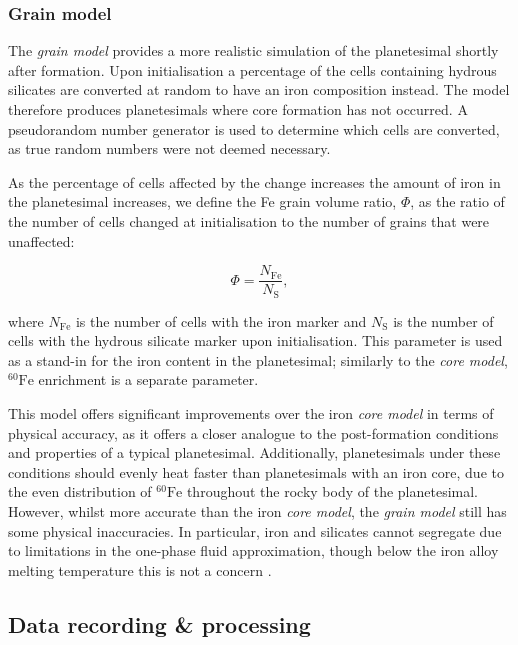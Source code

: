 \documentclass[fleqn,usenatbib]{mnras}
\newcommand{\rms}[1]{\ensuremath{_{\text{#1}}}}
\newcommand{\atom}[2]{$^{#2}\text{#1}$}
\newcommand{\fe}{\atom{Fe}{60}}
\begin{document}
\subsubsection{Grain model}

The \emph{grain model} provides a more realistic simulation of the planetesimal shortly after formation.
Upon initialisation a percentage of the cells containing hydrous silicates are converted at random to have an iron composition instead.
The model therefore produces planetesimals where core formation has not occurred.
A pseudorandom number generator is used to determine which cells are converted, as true random numbers were not deemed necessary.

As the percentage of cells affected by the change increases the amount of iron in the planetesimal increases, we define the Fe grain volume ratio, $\Phi$, as the ratio of the number of cells changed at initialisation to the number of grains that were unaffected:

\begin{equation}
  \label{eq:phi}
  \Phi = \frac{N\rms{Fe}}{N\rms{S}} , 
\end{equation}

\noindent
where $N\rms{Fe}$ is the number of cells with the iron marker and $N\rms{S}$ is the number of cells with the hydrous silicate marker upon initialisation.
This parameter is used as a stand-in for the iron content in the planetesimal; similarly to the \emph{core model}, \fe{} enrichment is a separate parameter.

This model offers significant improvements over the iron \emph{core model} in terms of physical accuracy, as it offers a closer analogue to the post-formation conditions and properties of a typical planetesimal.
Additionally, planetesimals under these conditions should evenly heat faster than planetesimals with an iron core, due to the even distribution of \fe{} throughout the rocky body of the planetesimal.
However, whilst more accurate than the iron \emph{core model}, the \emph{grain model} still has some physical inaccuracies.
In particular, iron and silicates cannot segregate due to limitations in the one-phase fluid approximation, though below the iron alloy melting temperature this is not a concern \citep{2019GeoJI.219..185K,2021JGRE..12606754Z}.

\subsection{Data recording \& processing}
\end{document}
